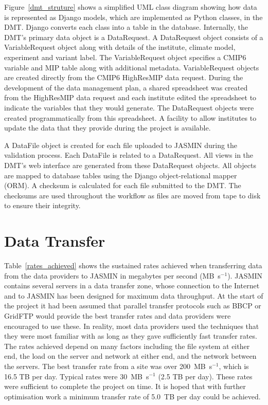 \documentclass[gmd, manuscript]{copernicus}
\begin{document}
Figure~\ref{dmt_struture} shows a simplified UML class diagram showing how data is represented as Django models, which are implemented as Python classes, in the DMT. Django converts each class into a table in the database. Internally, the DMT's primary data object is a DataRequest. A DataRequest object consists of a VariableRequest object along with details of the institute, climate model, experiment and variant label. The VariableRequest object specifies a CMIP6 variable and MIP table along with additional metadata. VariableRequest objects are created directly from the CMIP6 HighResMIP data request. During the development of the data management plan, a shared spreadsheet was created from the HighResMIP data request and each institute edited the spreadsheet to indicate the variables that they would generate. The DataRequest objects were created programmatically from this spreadsheet. A facility to allow institutes to update the data that they provide during the project is available.

A DataFile object is created for each file uploaded to JASMIN during the validation process. Each DataFile is related to a DataRequest. All views in the DMT's web interface are generated from these DataRequest objects. All objects are mapped to database tables using the Django object-relational mapper (ORM). A checksum is calculated for each file submitted to the DMT. The checksums are used throughout the workflow as files are moved from tape to disk to ensure their integrity.

\section{Data Transfer}
\label{transfer_rates}

Table~\ref{rates_achieved} shows the sustained rates achieved when transferring data from the data providers to JASMIN in megabytes per second (MB~s$^{-1}$). JASMIN contains several servers in a data transfer zone, whose connection to the Internet and to JASMIN has been designed for maximum data throughput. At the start of the project it had been assumed that parallel transfer protocols such as BBCP or GridFTP would provide the best transfer rates and data providers were encouraged to use these. In reality, most data providers used the techniques that they were most familiar with as long as they gave sufficiently fast transfer rates. The rates achieved depend on many factors including the file system at either end, the load on the server and network at either end, and the network between the servers. The best transfer rate from a site was over 200~MB~s$^{-1}$, which is 16.5 TB per day. Typical rates were 30~MB~s$^{-1}$ (2.5 TB per day). These rates were sufficient to complete the project on time. It is hoped that with further optimisation work a minimum transfer rate of 5.0~TB per day could be achieved.
\end{document}
